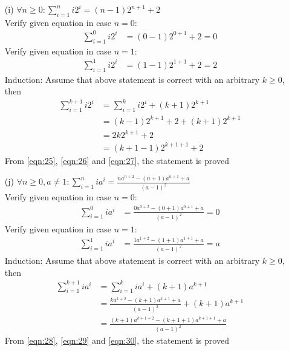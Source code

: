 \begin{enumerate}
    \newpage
    \item[(i)] $\forall n\geq 0: \displaystyle\sum^{n}_{i=1} i2^i = (n-1)2^{n+1}+2$ \\
    Verify given equation in case $n=0$:
        \begin{align}
            \displaystyle\sum^{0}_{i=1} i2^i &= (0-1)2^{0+1}+2 = 0 \label{eqn:25}
        \end{align}
    Verify given equation in case $n=1$:
        \begin{align}
            \displaystyle\sum^{1}_{i=1} i2^i &= (1-1)2^{1+1}+2 = 2 \label{eqn:26}
        \end{align}
    Induction: Assume that above statement is correct with an arbitrary $k \geq 0$, then\\
    \begin{align}
        \displaystyle\sum^{k+1}_{i=1} i2^i &= \displaystyle\sum^{k}_{i=1} i2^i + (k+1)2^{k+1} \\
                                        &= (k-1)2^{k+1} +2 + (k+1)2^{k+1} \\
                                        &= 2k2^{k+1} + 2 \\
                                        &= (k+1-1)2^{k+1+1} +2 \label{eqn:27}
    \end{align}
    From \ref{eqn:25}, \ref{eqn:26} and \ref{eqn:27}, the statement is proved
    
    \item[(j)] $\forall n\geq 0, a\neq 1: \displaystyle\sum^{n}_{i=1} ia^i = \frac{na^{n+2}-(n+1)a^{n+1}+a}{(a-1)^2}$ \\
    Verify given equation in case $n=0$:
        \begin{align}
            \displaystyle\sum^{0}_{i=1} ia^i &= \frac{0a^{0+2}-(0+1)a^{0+1}+a}{(a-1)^2} = 0 \label{eqn:28}
        \end{align}
    Verify given equation in case $n=1$:
        \begin{align}
            \displaystyle\sum^{1}_{i=1} ia^i &= \frac{1a^{1+2}-(1+1)a^{1+1}+a}{(a-1)^2} = a \label{eqn:29}
        \end{align}
    Induction: Assume that above statement is correct with an arbitrary $k \geq 0$, then\\
    \begin{align}
        \displaystyle\sum^{k+1}_{i=1} ia^i &= \displaystyle\sum^{k}_{i=1} ia^i + (k+1)a^{k+1} \\
                                        &= \frac{ka^{k+2}-(k+1)a^{k+1}+a}{(a-1)^2} + (k+1)a^{k+1} \\
                                        &= \frac{(k+1)a^{k+1+2}-(k+1+1)a^{k+1+1}+a}{(a-1)^2} \label{eqn:30}
    \end{align}
    From \ref{eqn:28}, \ref{eqn:29} and \ref{eqn:30}, the statement is proved
    

\end{enumerate}
